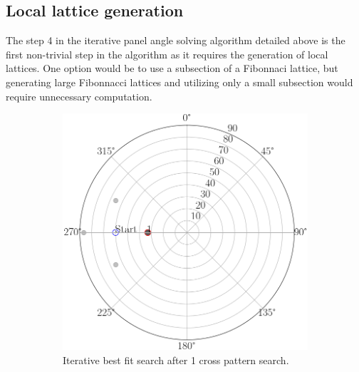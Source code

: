 \newpage

\subsection{Local lattice generation}
The step 4 in the iterative panel angle solving algorithm detailed above is the first non-trivial step in the algorithm as it requires the generation of local lattices. One option would be to use a subsection of a Fibonnaci lattice, but generating large Fibonnacci lattices and utilizing only a small subsection would require unnecessary computation. 

\begin{figure}[H]
     \centering
     \begin{subfigure}[b]{0.45\textwidth}
         \centering
         \includegraphics[width=\textwidth]{pics/iterative_1_step}
         \caption{Iterative best fit search after 1 cross pattern search.}
         \label{fig_iterative_1_step}
     \end{subfigure}
     \hfill
     \begin{subfigure}[b]{0.45\textwidth}
         \centering

\end{subfigure}
\end{figure}
